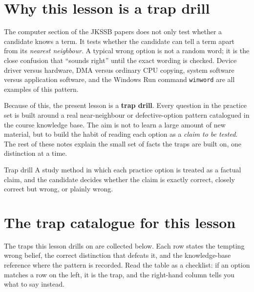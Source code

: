 \section{Why this lesson is a trap drill}
The computer section of the JKSSB papers does not only test whether a
candidate knows a term. It tests whether the candidate can tell a term apart
from its \emph{nearest neighbour}. A typical wrong option is not a random
word; it is the close confusion that ``sounds right'' until the exact wording
is checked. Device driver versus hardware, DMA versus ordinary CPU copying,
system software versus application software, and the Windows Run command
\texttt{winword} are all examples of this pattern.

Because of this, the present lesson is a \textbf{trap drill}. Every question
in the practice set is built around a real near-neighbour or defective-option
pattern catalogued in the course knowledge base. The aim is not to learn a
large amount of new material, but to build the habit of reading each option
as a \emph{claim to be tested}. The rest of these notes explain the small set
of facts the traps are built on, one distinction at a time.

\begin{definitionbox}{Trap drill}
A study method in which each practice option is treated as a factual claim,
and the candidate decides whether the claim is exactly correct, closely
correct but wrong, or plainly wrong.
\end{definitionbox}

\section{The trap catalogue for this lesson}
The traps this lesson drills on are collected below. Each row states the
tempting wrong belief, the correct distinction that defeats it, and the
knowledge-base reference where the pattern is recorded. Read the table as a
checklist: if an option matches a row on the left, it is the trap, and the
right-hand column tells you what to say instead.

